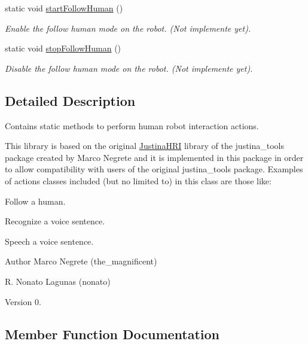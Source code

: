 \begin{DoxyCompactItemize}
static void \hyperlink{class_justina_h_r_i_ae7683e170752c6771f1a9dbad50eb73d}{start\+Follow\+Human} ()
\begin{DoxyCompactList}\small\item\em Enable the follow human mode on the robot. (Not implemente yet). \end{DoxyCompactList}\item 
static void \hyperlink{class_justina_h_r_i_ab8f40b9964709dd4d3f7c841ba30bf09}{stop\+Follow\+Human} ()
\begin{DoxyCompactList}\small\item\em Disable the follow human mode on the robot. (Not implemente yet). \end{DoxyCompactList}\end{DoxyCompactItemize}


\subsection{Detailed Description}
Contains static methods to perform human robot interaction actions. 

This library is based on the original \hyperlink{class_justina_h_r_i}{Justina\+H\+RI} library of the justina\+\_\+tools package created by Marco Negrete and it is implemented in this package in order to allow compatibility with users of the original justina\+\_\+tools package. Examples of actions classes included (but no limited to) in this class are those like\+:
\begin{DoxyItemize}
\item Follow a human.
\item Recognize a voice sentence.
\item Speech a voice sentence.
\end{DoxyItemize}

\begin{DoxyAuthor}{Author}
Marco Negrete (the\+\_\+magnificent) 

R. Nonato Lagunas (nonato) 
\end{DoxyAuthor}
\begin{DoxyVersion}{Version}
0. 
\end{DoxyVersion}


\subsection{Member Function Documentation}
